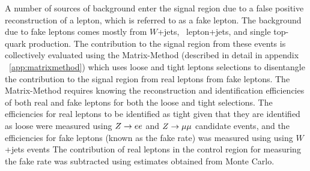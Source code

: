 

A number of sources of background enter the signal region due to a false positive reconstruction
of a lepton, which is referred to as a fake lepton.
The background due to fake leptons comes mostly from $W$+jets, \ttbar\, lepton+jets, and single top-quark production.
The contribution to the signal region from these events is collectively evaluated
using the Matrix-Method (described in detail in appendix ~\ref{app:matrixmethod}) which uses loose and tight
leptons selections to disentangle the contribution to the signal region from
real leptons from fake leptons.
The Matrix-Method requires knowing the reconstruction and identification efficiencies of both
real and fake leptons for both the loose and tight selections.
The efficiencies for real leptons to be identified as tight given that they are identified as loose
were measured using $Z \rightarrow ee$ and $Z \rightarrow \mu\mu$ candidate events, and the efficiencies for fake leptons
(known as the fake rate) was measured using using $W$+jets events
The contribution of real leptons in the control region for measuring the fake rate was 
subtracted using estimates obtained from Monte Carlo.


